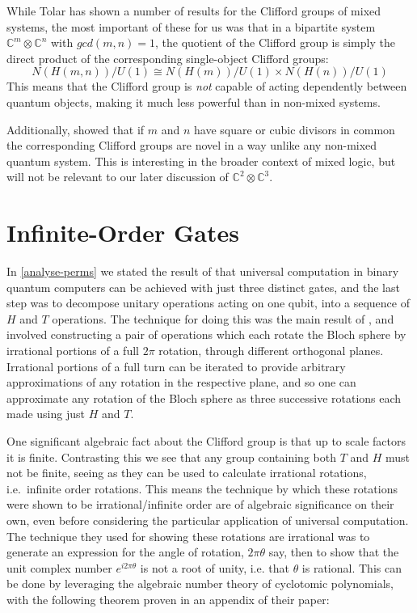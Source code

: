 While Tolar has shown a number of results for the Clifford groups of mixed systems, the most important of these for us was that in a bipartite system $\mathbb{C}^m \otimes \mathbb{C}^n$ with $gcd(m, n) = 1$, the quotient of the Clifford group is simply the direct product of the corresponding single-object Clifford groups:
\[N(H(m, n))/U(1) \cong N(H(m))/U(1) \times N(H(n))/U(1) \]
This means that the Clifford group is \emph{not} capable of acting dependently between quantum objects, making it much less powerful than in non-mixed systems.

Additionally, \cite{tolar-clifford} showed that if $m$ and $n$ have square or cubic divisors in common the corresponding Clifford groups are novel in a way unlike any non-mixed quantum system. This is interesting in the broader context of mixed logic, but will not be relevant to our later discussion of $\mathbb{C}^2 \otimes \mathbb{C}^3$.

\section{Infinite-Order Gates}\label{infinite-order}
In \autoref{analyse-perms} we stated the result of \cite{universal-qubit} that universal computation in binary quantum computers can be achieved with just three distinct gates, and the last step was to decompose unitary operations acting on one qubit, into a sequence of $H$ and $T$ operations. The technique for doing this was the main result of \cite{universal-qubit}, and involved constructing a pair of operations which each rotate the Bloch sphere by irrational portions of a full $2\pi$ rotation, through different orthogonal planes. Irrational portions of a full turn can be iterated to provide arbitrary approximations of any rotation in the respective plane, and so one can approximate any rotation of the Bloch sphere as three successive rotations each made using just $H$ and $T$.

One significant algebraic fact about the Clifford group is that up to scale factors it is finite. Contrasting this we see that any group containing both $T$ and $H$ must not be finite, seeing as they can be used to calculate irrational rotations, i.e.\ infinite order rotations. This means the technique by which these rotations were shown to be irrational/infinite order are of algebraic significance on their own, even before considering the particular application of universal computation. The technique they used for showing these rotations are irrational was to generate an expression for the angle of rotation, $2\pi \theta$ say, then to show that the unit complex number $e^{i2\pi \theta}$ is not a root of unity, i.e. that $\theta$ is rational. This can be done by leveraging the algebraic number theory of cyclotomic polynomials, with the following theorem proven in an appendix of their paper:

